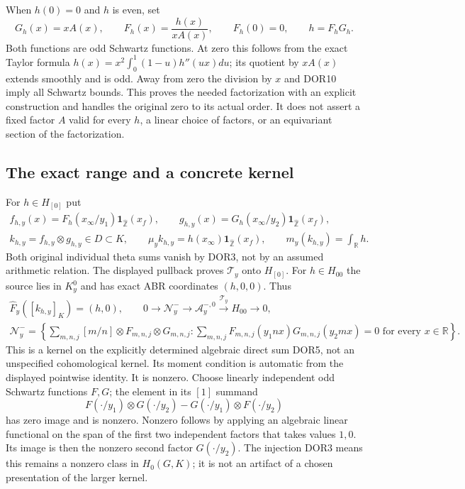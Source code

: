 When $h(0)=0$ and $h$ is even, set
\begin{equation}\tag{DOR12}
G_h(x)=xA(x),\qquad F_h(x)=\frac{h(x)}{xA(x)},\qquad
F_h(0)=0,\qquad h=F_hG_h.
\end{equation}
Both functions are odd Schwartz functions. At zero this follows
from the exact Taylor formula
$h(x)=x^2\int_0^1(1-u)h''(ux)du$; its quotient by $xA(x)$
extends smoothly and is odd. Away from zero the division by $x$
and DOR10 imply all Schwartz bounds. This proves the needed
factorization with an explicit construction and handles the
original zero to its actual order. It does not assert a fixed
factor $A$ valid for every $h$, a linear choice of factors, or
an equivariant section of the factorization.

\subsection{The exact range and a concrete kernel}

For $h\in H_{[0]}$ put
\begin{equation}\tag{DOR13}
\begin{gathered}
f_{h,y}(x)=F_h(x_\infty/y_1)\mathbf1_{\widehat{\mathbb Z}}(x_f),
\qquad
g_{h,y}(x)=G_h(x_\infty/y_2)\mathbf1_{\widehat{\mathbb Z}}(x_f),\\
k_{h,y}=f_{h,y}\otimes g_{h,y}\in D\subset K,\qquad
\mu_y k_{h,y}=h(x_\infty)\mathbf1_{\widehat{\mathbb Z}}(x_f),\qquad
m_y(k_{h,y})=\int_{\mathbb R}h.
\end{gathered}
\end{equation}
Both original individual theta sums vanish by DOR3, not by an
assumed arithmetic relation. The displayed pullback proves
$\mathcal T_y$ onto $H_{[0]}$. For $h\in H_{00}$ the source lies
in $K_y^0$ and has exact ABR coordinates $(h,0,0)$. Thus
\begin{equation}\tag{DOR14}
\begin{gathered}
\widehat F_y([k_{h,y}]_K)=(h,0),\qquad
0\longrightarrow\mathcal N_y^-
 \longrightarrow\mathcal A_y^{-,0}
 \xrightarrow{\mathcal T_y}H_{00}\longrightarrow0,\\
\mathcal N_y^-=
\left\{\sum_{m,n,j}[m/n]\otimes F_{m,n,j}\otimes G_{m,n,j}:
\sum_{m,n,j}F_{m,n,j}(y_1nx)G_{m,n,j}(y_2mx)=0
\text{ for every }x\in\mathbb R\right\}.
\end{gathered}
\end{equation}
This is a kernel on the explicitly determined algebraic direct
sum DOR5, not an unspecified cohomological kernel. Its moment
condition is automatic from the displayed pointwise identity.
It is nonzero. Choose linearly independent odd Schwartz functions
$F,G$; the element in its $[1]$ summand
\[
F(\cdot/y_1)\otimes G(\cdot/y_2)
 -G(\cdot/y_1)\otimes F(\cdot/y_2)
\]
has zero image and is nonzero. Nonzero follows by applying an
algebraic linear functional on the span of the first two independent
factors that takes values $1,0$. Its image is then the nonzero
second factor $G(\cdot/y_2)$. The injection DOR3 means this remains
a nonzero class in $H_0(G,K)$; it is not an artifact of a chosen
presentation of the larger kernel.

